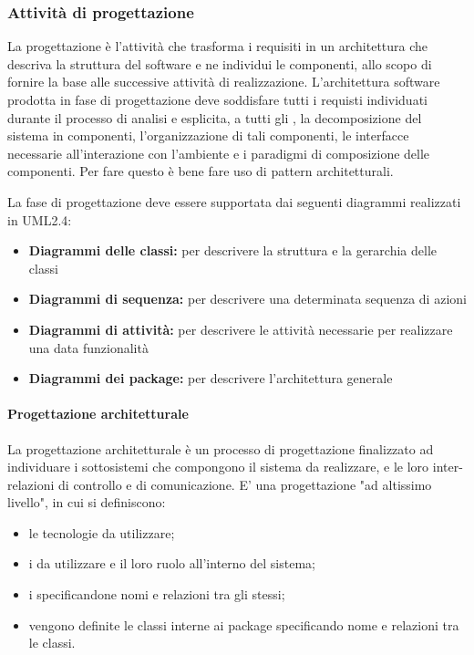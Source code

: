 \documentclass[12pt,a4paper]{article}
\begin{document}
\subsubsection{Attività di progettazione}
La progettazione è l'attività che trasforma i requisiti in un architettura che descriva la struttura del software e ne individui le componenti, allo scopo di fornire la base alle successive attività di realizzazione. L'architettura software prodotta in fase di progettazione deve soddisfare tutti i requisti individuati durante il processo di analisi e esplicita, a tutti gli , la decomposizione del sistema in componenti, l'organizzazione di tali componenti, le interfacce necessarie all'interazione con l'ambiente e i paradigmi di composizione delle componenti. Per fare questo è bene fare uso di pattern architetturali.

La fase di progettazione deve essere supportata dai seguenti diagrammi realizzati in UML2.4:
\begin{itemize}
	\item \textbf{Diagrammi delle classi:} per descrivere la struttura e la gerarchia delle classi
	\item \textbf{Diagrammi di sequenza:} per descrivere una determinata sequenza di azioni
	\item \textbf{Diagrammi di attività:} per descrivere le attività necessarie per realizzare una data funzionalità
	\item \textbf{Diagrammi dei package:} per descrivere l'architettura generale
\end{itemize}




\paragraph{Progettazione architetturale}\label{progettazioneArchitetturale}

La progettazione architetturale è un processo di progettazione finalizzato ad individuare i sottosistemi che compongono il sistema da realizzare, e le loro inter-relazioni di controllo e di comunicazione.
E' una progettazione "ad altissimo livello", in cui si definiscono:
\begin{itemize}
	\item le tecnologie da utilizzare;
	\item i  da utilizzare e il loro ruolo all'interno del sistema;
	\item i  specificandone nomi e relazioni tra gli stessi;
	\item vengono definite le classi interne ai package specificando nome e relazioni tra le classi.
\end{itemize}
\end{document}

